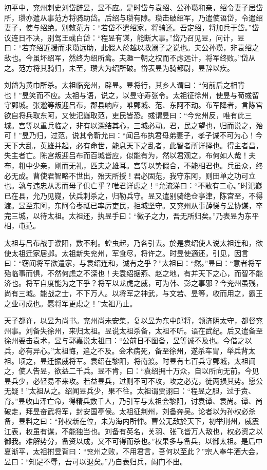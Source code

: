 \documentclass[12pt,UTF8]{ctexbook}
\begin{document}
初平中，兖州刺史刘岱辟昱，昱不应。是时岱与袁绍、公孙瓒和亲，绍令妻子居岱所，瓒亦遣从事范方将骑助岱。后绍与瓒有隙。瓒击破绍军，乃遣使语岱，令遣绍妻子，使与绍绝。别敕范方：“若岱不遣绍家，将骑还。吾定绍，将加兵于岱。”岱议连日不决，别驾王彧白岱：“程昱有谋，能断大事。”岱乃召见昱，问计，昱曰：“若弃绍近援而求瓒远助，此假人於越以救溺子之说也。夫公孙瓒，非袁绍之敌也。今虽坏绍军，然终为绍所禽。夫趣一朝之权而不虑远计，将军终败。”岱从之。范方将其骑归，未至，瓒大为绍所破。岱表昱为骑都尉，昱辞以疾。

刘岱为黄巾所杀。太祖临兖州，辟昱。昱将行，其乡人谓曰：“何前后之相背也！”昱笑而不应。太祖与语，说之，以昱守寿张令。太祖征徐州，使昱与荀彧留守鄄城。张邈等叛迎吕布，郡县响应，唯鄄城、范、东阿不动。布军降者，言陈宫欲自将兵取东阿，又使氾嶷取范，吏民皆恐。彧谓昱曰：“今兖州反，唯有此三城。宫等以重兵临之，非有以深结其心，三城必动。君，民之望也，归而说之，殆可！”昱乃归，过范，说其令靳允曰：“闻吕布执君母弟妻子，孝子诚不可为心！今天下大乱，英雄并起，必有命世，能息天下之乱者，此智者所详择也。得主者昌，失主者亡。陈宫叛迎吕布而百城皆应，似能有为，然以君观之，布何如人哉！夫布，粗中少亲，刚而无礼，匹夫之雄耳。宫等以势假合，不能相君也。兵虽众，终必无成。曹使君智略不世出，殆天所授！君必固范，我守东阿，则田单之功可立也。孰与违忠从恶而母子俱亡乎？唯君详虑之！“允流涕曰：“不敢有二心。”时氾嶷已在县，允乃见嶷，伏兵刺杀之，归勒兵守。昱又遣别骑绝仓亭津，陈宫至，不得渡。昱至东阿，东阿令枣祗已率厉吏民，拒城坚守。又兖州从事薛悌与昱协谋，卒完三城，以待太祖。太祖还，执昱手曰：“微子之力，吾无所归矣。”乃表昱为东平相，屯范。

太祖与吕布战于濮阳，数不利。蝗虫起，乃各引去。於是袁绍使人说太祖连和，欲使太祖迁家居邺。太祖新失兖州，军食尽，将许之。时昱使適还，引见，因言曰：“窃闻将军欲遣家，与袁绍连和，诚有之乎？”太祖曰：“然。”昱曰：“意者将军殆临事而惧，不然何虑之不深也！夫袁绍据燕、赵之地，有并天下之心，而智不能济也。将军自度能为之下乎？将军以龙虎之威，可为韩、彭之事邪？今兖州虽残，尚有三城。能战之士，不下万人。以将军之神武，与文若、昱等，收而用之，霸王之业可成也。愿将军更虑之！”太祖乃止。

天子都许，以昱为尚书。兖州尚未安集，复以昱为东中郎将，领济阴太守，都督兖州事。刘备失徐州，来归太祖。昱说太祖杀备，太祖不听。语在武纪。后又遣备至徐州要击袁术，昱与郭嘉说太祖曰：“公前日不图备，昱等诚不及也。今借之以兵，必有异心。”太祖悔，追之不及。会术病死，备至徐州，遂杀车胄，举兵背太祖。顷之，昱迁振威将军。袁绍在黎阳，将南渡。时昱有七百兵守鄄城，太祖闻之，使人告昱，欲益二千兵。昱不肯，曰：“袁绍拥十万众，自以所向无前。今见昱兵少，必轻易不来攻。若益昱兵，过则不可不攻，攻之必克，徒两损其势。愿公无疑！”太祖从之。绍闻昱兵少，果不往。太祖谓贾诩曰：“程昱之胆，过于贲、育。”昱收山泽亡命，得精兵数千人，乃引军与太祖会黎阳，讨袁谭、袁尚。谭、尚破走，拜昱奋武将军，封安国亭侯。太祖征荆州，刘备奔吴。论者以为孙权必杀备，昱料之曰：“孙权新在位，未为海内所惮。曹公无敌於天下，初举荆州，威震江表，权虽有谋，不能独当也。刘备有英名，关羽、张飞皆万人敌也，权必资之以御我。难解势分，备资以成，又不可得而杀也。”权果多与备兵，以御太祖。是后中夏渐平，太祖拊昱背曰：“兖州之败，不用君言，吾何以至此？”宗人奉牛酒大会，昱曰：“知足不辱，吾可以退矣。”乃自表归兵，阖门不出。
\end{document}
